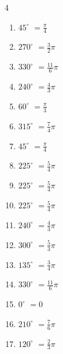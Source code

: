 \begin{multicols}{4}
\begin{enumerate}
\columnbreak %

  \item $\displaystyle 45^{\circ}$
        $\displaystyle =\frac{\pi}{4}$

  \item $\displaystyle 270^{\circ}$
        $\displaystyle =\frac{3}{2}\pi$

  \item $\displaystyle 330^{\circ}$
        $\displaystyle =\frac{11}{6}\pi$

  \item $\displaystyle 240^{\circ}$
        $\displaystyle =\frac{4}{3}\pi$

  \item $\displaystyle 60^{\circ}$
        $\displaystyle =\frac{\pi}{3}$

  \item $\displaystyle 315^{\circ}$
        $\displaystyle =\frac{7}{4}\pi$

  \item $\displaystyle 45^{\circ}$
        $\displaystyle =\frac{\pi}{4}$

  \item $\displaystyle 225^{\circ}$
        $\displaystyle =\frac{5}{4}\pi$

  \item $\displaystyle 225^{\circ}$
        $\displaystyle =\frac{5}{4}\pi$

  \item $\displaystyle 225^{\circ}$
        $\displaystyle =\frac{5}{4}\pi$

  \item $\displaystyle 240^{\circ}$
        $\displaystyle =\frac{4}{3}\pi$

  \item $\displaystyle 300^{\circ}$
        $\displaystyle =\frac{5}{3}\pi$

  \item $\displaystyle 135^{\circ}$
        $\displaystyle =\frac{3}{4}\pi$

  \item $\displaystyle 330^{\circ}$
        $\displaystyle =\frac{11}{6}\pi$

  \item $\displaystyle 0^{\circ}$
        $\displaystyle =0$

  \item $\displaystyle 210^{\circ}$
        $\displaystyle =\frac{7}{6}\pi$

  \item $\displaystyle 120^{\circ}$
        $\displaystyle =\frac{2}{3}\pi$


\end{enumerate}
\end{multicols}
